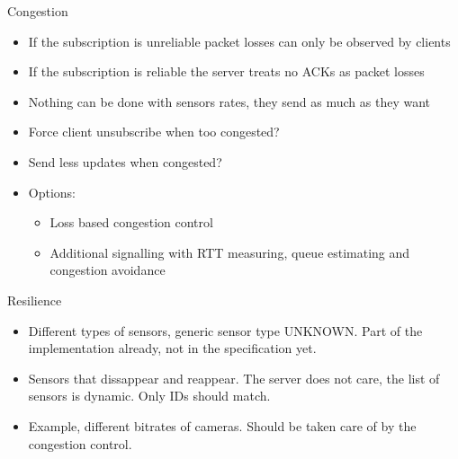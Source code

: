 \documentclass{beamer}
\begin{document}
\begin{frame}{Congestion}
    \begin{itemize}
        \item If the subscription is unreliable packet losses can only be observed by clients
        \item If the subscription is reliable the server treats no ACKs as packet losses
        \item Nothing can be done with sensors rates, they send as much as they want
        \item Force client unsubscribe when too congested?
        \item Send less updates when congested?
        \item Options:
        \begin{itemize}
            \item Loss based congestion control
            \item Additional signalling with RTT measuring, queue estimating and
            congestion avoidance
        \end{itemize}

    \end{itemize}
\end{frame}

\begin{frame}{Resilience}
    \begin{itemize}
        \item Different types of sensors, generic sensor type UNKNOWN. Part
              of the implementation already, not in the specification yet.
        
        \item Sensors that dissappear and reappear. The server does not care,
              the list of sensors is dynamic. Only IDs should match.

        \item Example, different bitrates of cameras. Should be taken care of by
              the congestion control.

    \end{itemize}
\end{frame}
\end{document}
